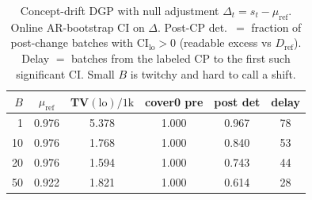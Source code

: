 \begin{table}[ht]
\centering
\caption{Concept-drift DGP with null adjustment $\Delta_t=s_t-\mu_{\mathrm{ref}}$. Online AR-bootstrap CI on $\Delta$. Post-CP det.\ $=$ fraction of post-change batches with CI$_{\mathrm{lo}}>0$ (readable excess vs $D_{\mathrm{ref}}$). Delay $=$ batches from the labeled CP to the first such significant CI. Small $B$ is twitchy and hard to call a shift.}
\label{tab:concept-batchsize-boot-ci}
\small
\begin{tabular}{@{}r ccccc@{}}
\toprule
$B$ & $\mu_{\mathrm{ref}}$ & TV$(\mathrm{lo})/1\mathrm{k}$ & cover0 pre & post det & delay \\
\midrule
1 & 0.976 & 5.378 & 1.000 & 0.967 & 78 \\
10 & 0.976 & 1.768 & 1.000 & 0.840 & 53 \\
20 & 0.976 & 1.594 & 1.000 & 0.743 & 44 \\
50 & 0.922 & 1.821 & 1.000 & 0.614 & 28 \\
\bottomrule
\end{tabular}
\end{table}
